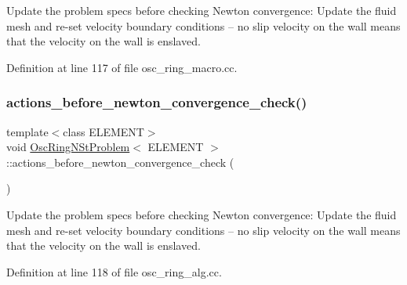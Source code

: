 Update the problem specs before checking Newton convergence\+: Update the fluid mesh and re-\/set velocity boundary conditions -- no slip velocity on the wall means that the velocity on the wall is enslaved. 



Definition at line 117 of file osc\+\_\+ring\+\_\+macro.\+cc.

\mbox{\label{classOscRingNStProblem_a98d4c847cd9d53ab3569b8418ecb0c6b}} 
\subsubsection{\texorpdfstring{actions\+\_\+before\+\_\+newton\+\_\+convergence\+\_\+check()}{actions\_before\_newton\_convergence\_check()}\hspace{0.1cm}{\footnotesize\ttfamily [2/2]}}
{\footnotesize\ttfamily template$<$class E\+L\+E\+M\+E\+NT$>$ \\
void \hyperlink{classOscRingNStProblem}{Osc\+Ring\+N\+St\+Problem}$<$ E\+L\+E\+M\+E\+NT $>$\+::actions\+\_\+before\+\_\+newton\+\_\+convergence\+\_\+check (\begin{DoxyParamCaption}{ }\end{DoxyParamCaption})\hspace{0.3cm}{\ttfamily [inline]}}



Update the problem specs before checking Newton convergence\+: Update the fluid mesh and re-\/set velocity boundary conditions -- no slip velocity on the wall means that the velocity on the wall is enslaved. 



Definition at line 118 of file osc\+\_\+ring\+\_\+alg.\+cc.

\mbox{\label{classOscRingNStProblem_a7d8ff9543c042752b649ed326d6c5915}} 
